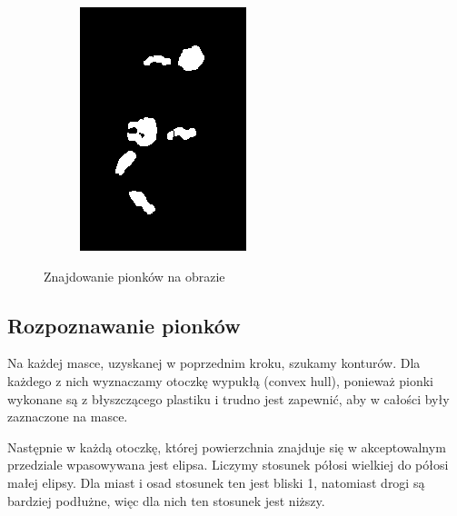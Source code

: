 \documentclass[a4paper]{article}
\begin{document}
\begin{figure}[H]
\begin{subfigure}[t]{0.3\linewidth}
            \includegraphics[width=\linewidth]{pictures/steps/pawns_mask_dilated.png}
        \end{subfigure}
        \caption{Znajdowanie pionków na obrazie}
    \end{figure}

    \subsection{Rozpoznawanie pionków}
    Na każdej masce, uzyskanej w poprzednim kroku, szukamy konturów. Dla każdego z nich wyznaczamy otoczkę wypukłą (convex hull), ponieważ pionki wykonane są z błyszczącego plastiku i trudno jest zapewnić, aby w całości były zaznaczone na masce.

    Następnie w każdą otoczkę, której powierzchnia znajduje się w akceptowalnym przedziale wpasowywana jest elipsa.
    Liczymy stosunek półosi wielkiej do półosi małej elipsy. Dla miast i osad stosunek ten jest bliski 1, natomiast drogi są bardziej podłużne, więc dla nich ten stosunek jest niższy.
\end{document}
